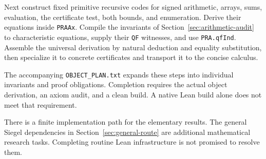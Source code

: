 Next construct fixed primitive recursive codes for signed arithmetic,
arrays, sums, evaluation, the certificate test, both bounds, and
enumeration. Derive their equations inside \texttt{PRAAx}. Compile
the invariants of Section~\ref{sec:arithmetic-audit} to characteristic
equations, supply their \texttt{QF} witnesses, and use
\texttt{PRA.qfInd}. Assemble the universal derivation by natural
deduction and equality substitution, then specialize it to concrete
certificates and transport it to the concise calculus.

The accompanying \texttt{OBJECT\_PLAN.txt} expands these steps into
individual invariants and proof obligations. Completion requires
the actual object derivation, an axiom audit, and a clean build.
A native Lean build alone does not meet that requirement.

There is a finite implementation path for the elementary results.
The general Siegel dependencies in Section~\ref{sec:general-route}
are additional mathematical research tasks. Completing routine Lean
infrastructure is not promised to resolve them.

